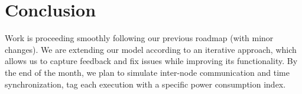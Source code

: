 
\section{Conclusion}
\label{sec:conclusion}

Work is proceeding smoothly following our previous roadmap (with minor changes). We are extending our model according to an iterative approach, which allows us to capture feedback and fix issues while improving its functionality. By the end of the month, we plan to simulate inter-node communication and time synchronization, tag each execution with a specific power consumption index.



